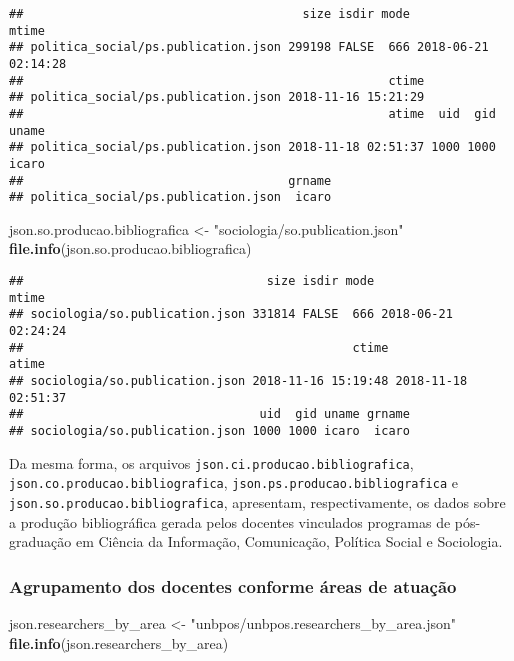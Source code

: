 \documentclass[]{article}
\newenvironment{Shaded}{\begin{snugshade}}{\end{snugshade}}
\newcommand{\KeywordTok}[1]{\textcolor[rgb]{0.13,0.29,0.53}{\textbf{#1}}}
\newcommand{\StringTok}[1]{\textcolor[rgb]{0.31,0.60,0.02}{#1}}
\newcommand{\NormalTok}[1]{#1}
\begin{document}
\begin{verbatim}
##                                       size isdir mode               mtime
## politica_social/ps.publication.json 299198 FALSE  666 2018-06-21 02:14:28
##                                                   ctime
## politica_social/ps.publication.json 2018-11-16 15:21:29
##                                                   atime  uid  gid uname
## politica_social/ps.publication.json 2018-11-18 02:51:37 1000 1000 icaro
##                                     grname
## politica_social/ps.publication.json  icaro
\end{verbatim}

\begin{Shaded}
\begin{Highlighting}[]
\NormalTok{json.so.producao.bibliografica <-}\StringTok{ "sociologia/so.publication.json"}
\KeywordTok{file.info}\NormalTok{(json.so.producao.bibliografica)}
\end{Highlighting}
\end{Shaded}

\begin{verbatim}
##                                  size isdir mode               mtime
## sociologia/so.publication.json 331814 FALSE  666 2018-06-21 02:24:24
##                                              ctime               atime
## sociologia/so.publication.json 2018-11-16 15:19:48 2018-11-18 02:51:37
##                                 uid  gid uname grname
## sociologia/so.publication.json 1000 1000 icaro  icaro
\end{verbatim}

Da mesma forma, os arquivos \texttt{json.ci.producao.bibliografica},
\texttt{json.co.producao.bibliografica},
\texttt{json.ps.producao.bibliografica} e
\texttt{json.so.producao.bibliografica}, apresentam, respectivamente, os
dados sobre a produção bibliográfica gerada pelos docentes vinculados
programas de pós-graduação em Ciência da Informação, Comunicação,
Política Social e Sociologia.

\subsubsection{Agrupamento dos docentes conforme áreas de
atuação}\label{agrupamento-dos-docentes-conforme-areas-de-atuacao}

\begin{Shaded}
\begin{Highlighting}[]
\NormalTok{json.researchers_by_area <-}\StringTok{ "unbpos/unbpos.researchers_by_area.json"} 
\KeywordTok{file.info}\NormalTok{(json.researchers_by_area)}
\end{Highlighting}
\end{Shaded}
\end{document}
